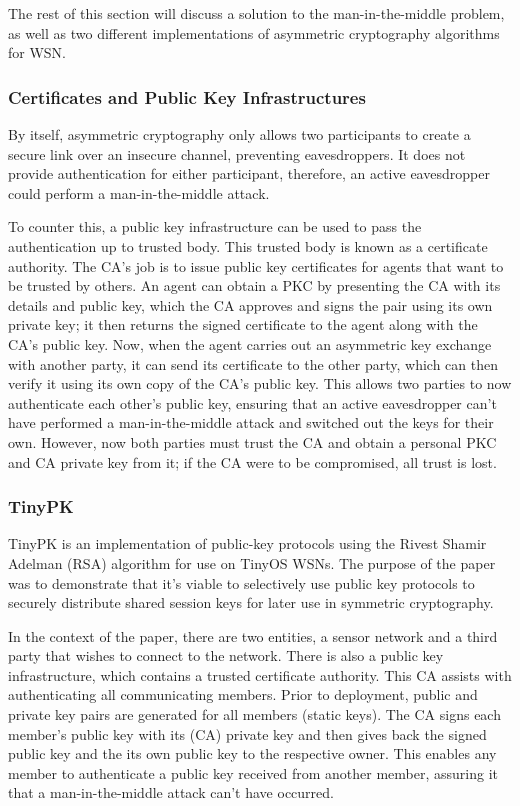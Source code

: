 \documentclass{mprop}
\begin{document}
The rest of this section will discuss a solution to the man-in-the-middle problem, as well as two different implementations of asymmetric cryptography algorithms for WSN.

\subsubsection{Certificates and Public Key Infrastructures} %
\label{ssub:certificates_and_public_key_infrastructures}
By itself, asymmetric cryptography only allows two participants to create a secure link over an insecure channel, preventing eavesdroppers. It does not provide authentication for either participant, therefore, an active eavesdropper could perform a man-in-the-middle attack. 

To counter this, a public key infrastructure can be used to pass the authentication up to trusted body. This trusted body is known as a certificate authority. The CA's job is to issue public key certificates for agents that want to be trusted by others. An agent can obtain a PKC by presenting the CA with its details and public key, which the CA approves and signs the pair using its own private key; it then returns the signed certificate to the agent along with the CA's public key. Now, when the agent carries out an asymmetric key exchange with another party, it can send its certificate to the other party, which can then verify it using its own copy of the CA's public key. This allows two parties to now authenticate each other's public key, ensuring that an active eavesdropper can't have performed a man-in-the-middle attack and switched out the keys for their own. However, now both parties must trust the CA and obtain a personal PKC and CA private key from it; if the CA were to be compromised, all trust is lost.


\subsubsection{TinyPK} %
\label{ssub:tinypk}
TinyPK is an implementation of public-key protocols using the Rivest Shamir Adelman (RSA) algorithm for use on TinyOS WSNs\cite{TinyPK}. The purpose of the paper was to demonstrate that it's viable to selectively use public key protocols to securely distribute shared session keys for later use in symmetric cryptography.

In the context of the paper, there are two entities, a sensor network and a third party that wishes to connect to the network. There is also a public key infrastructure, which contains a trusted certificate authority. This CA assists with authenticating all communicating members. Prior to deployment, public and private key pairs are generated for all members (static keys). The CA signs each member's public key with its (CA) private key and then gives back the signed public key and the its own public key to the respective owner. This enables any member to authenticate a public key received from another member, assuring it that a man-in-the-middle attack can't have occurred.
\end{document}
